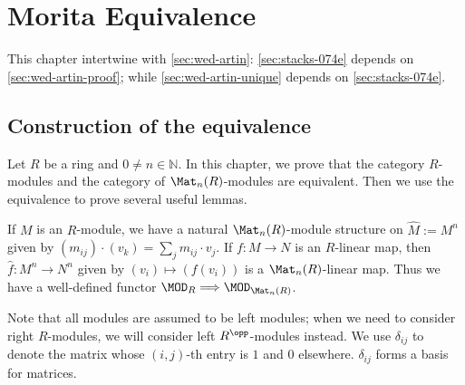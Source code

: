 


\chapter{Morita Equivalence}\label{sec:morita}

This chapter intertwine with \cref{sec:wed-artin}: \cref{sec:stacks-074e}
depends on \cref{sec:wed-artin-proof}; while \cref{sec:wed-artin-unique} depends
on \cref{sec:stacks-074e}.

\section{Construction of the equivalence}\label{sec:morita-construction}

Let $R$ be a ring and $0 \ne n\in \mathbb{N}$. In this chapter, we prove that
the category $R$-modules and the category of $\Mat_{n}(R)$-modules are
equivalent. Then we use the equivalence to prove several useful lemmas.

\begin{construction}\label{con:morita-eqv-functor0}
  \leanok
  If $M$ is an $R$-module, we have a natural
  $\Mat_{n}(R)$-module structure on $\widehat{M}:=M^{n}$ given by
  $(m_{ij})\cdot (v_{k})=\sum_{j}m_{ij}\cdot v_{j}$. If $f : M \to N$ is an
  $R$-linear map, then $\widehat{f} : M^{n}\to N^{n}$ given by
  $(v_{i}) \mapsto (f(v_{i}))$ is a $\Mat_{n}(R)$-linear map. Thus we have a
  well-defined functor $\MOD_{R} \Longrightarrow \MOD_{\Mat_{n}(R)}$.
\end{construction}

\begin{remark}
  Note that all modules are assumed to be left modules; when we need to consider
  right $R$-modules, we will consider left $R^{\opp}$-modules instead. We use
  $\delta_{ij}$ to denote the matrix whose $(i,j)$-th entry is $1$ and $0$
  elsewhere. $\delta_{ij}$ forms a basis for matrices.
\end{remark}

